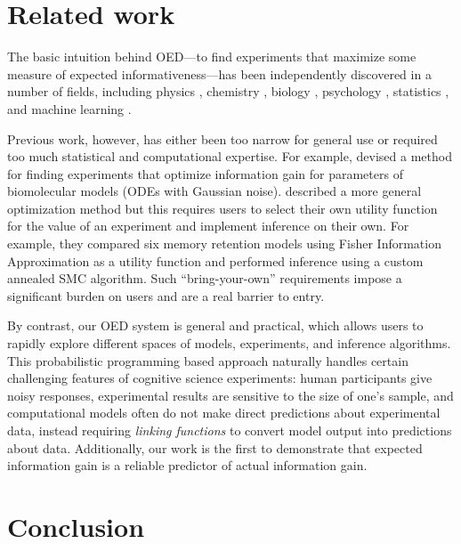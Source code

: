 \documentclass[10pt,letterpaper]{article}
\begin{document}

\section{Related work}

The basic intuition behind OED---to find experiments that maximize some measure of expected informativeness---has been independently discovered in a number of fields, including physics \citep{vanDenBerg2003}, chemistry \citep{Huan2010}, biology \citep{Vanlier2012, Liepe2013}, psychology \citep{Myung2009}, statistics \citep{Lindley1956}, and machine learning \citep{Golovin2010}.

Previous work, however, has either been too narrow for general use or required too much statistical and computational expertise.
For example, \cite{Liepe2013} devised a method for finding experiments that optimize information gain for parameters of biomolecular models (ODEs with Gaussian noise).
\cite{Myung2009} described a more general optimization method but this requires users to select their own utility function for the value of an experiment and implement inference on their own.
For example, they compared six memory retention models using Fisher Information Approximation as a utility function and performed inference using a custom annealed SMC algorithm.
Such ``bring-your-own'' requirements impose a significant burden on users and are a real barrier to entry.

By contrast, our OED system is general and practical, which allows users to rapidly explore different spaces of models, experiments, and inference algorithms.
This probabilistic programming based approach naturally handles certain challenging features of cognitive science experiments: human participants give noisy responses, experimental results are sensitive to the size of one's sample, and computational models often do not make direct predictions about experimental data, instead requiring \emph{linking functions} to convert model output into predictions about data.
Additionally, our work is the first to demonstrate that expected information gain is a reliable predictor of actual information gain.

\section{Conclusion}
\end{document}
